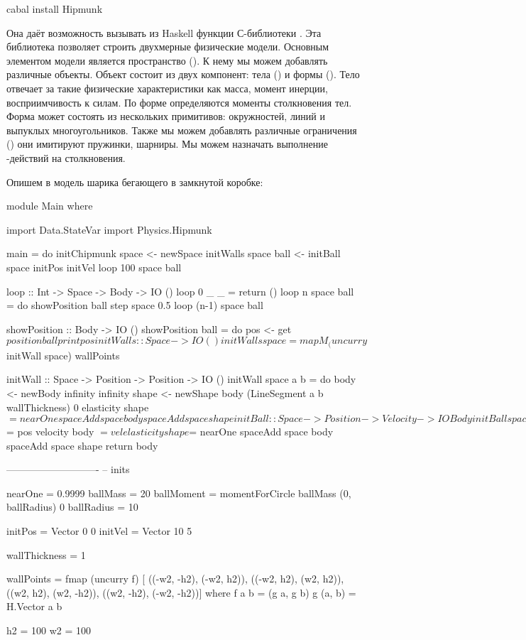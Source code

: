 \begin{code}
cabal install Hipmunk
\end{code}

Она даёт возможность вызывать из Haskell функции
С-библиотеки . Эта библиотека позволяет
строить двухмерные физические модели. 
Основным элементом модели является пространство ().
К нему мы можем добавлять различные объекты. Объект
состоит из двух компонент: тела () и формы ().
Тело отвечает за такие физические характеристики как масса,
момент инерции, восприимчивость к силам. По форме определяются
моменты столкновения тел. Форма может состоять из нескольких
примитивов: окружностей, линий и выпуклых многоугольников. 
Также мы можем добавлять различные ограничения 
() они имитируют пружинки, шарниры. 
Мы можем назначать выполнение -действий на
столкновения.

Опишем в  модель шарика бегающего в замкнутой 
коробке:

\begin{code}
module Main where 

import Data.StateVar
import Physics.Hipmunk

main = do
    initChipmunk
    space <- newSpace
    initWalls space
    ball <- initBall space initPos initVel
    loop 100 space ball

loop :: Int -> Space -> Body -> IO ()
loop 0 _     _    = return ()     
loop n space ball = do
    showPosition ball
    step space 0.5
    loop (n-1) space ball
  
showPosition :: Body -> IO ()
showPosition ball = do
    pos <- get $ position ball
    print pos

initWalls :: Space -> IO ()
initWalls space = mapM_ (uncurry $ initWall space) wallPoints

initWall :: Space -> Position -> Position -> IO ()
initWall space a b = do
    body    <- newBody infinity infinity
    shape   <- newShape body (LineSegment a b wallThickness) 0
    elasticity shape $= nearOne
    spaceAdd space body
    spaceAdd space shape

initBall :: Space -> Position -> Velocity -> IO Body
initBall space pos vel = do
    body    <- newBody ballMass ballMoment 
    shape   <- newShape body (Circle ballRadius) 0
    position body $= pos
    velocity body $= vel
    elasticity shape $= nearOne
    spaceAdd space body
    spaceAdd space shape
    return body
    
----------------------------
-- inits

nearOne = 0.9999
ballMass = 20
ballMoment = momentForCircle ballMass (0, ballRadius) 0
ballRadius = 10
    
initPos = Vector 0 0
initVel = Vector 10 5

wallThickness = 1

wallPoints = fmap (uncurry f) [
    ((-w2, -h2), (-w2, h2)),
    ((-w2, h2),  (w2, h2)),
    ((w2, h2),   (w2, -h2)),
    ((w2, -h2),  (-w2, -h2))]
    where f a b = (g a, g b) 
          g (a, b) = H.Vector a b  

h2 = 100
w2 = 100
\end{code}


